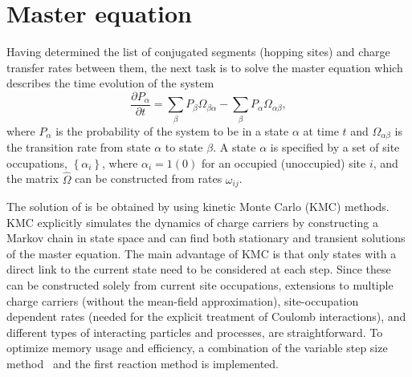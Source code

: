 \section{Master equation}
\label{sec:kmc}

Having determined the list of conjugated segments (hopping sites) and charge transfer rates between them, the next task is to solve the master equation which describes the time evolution of the system
%
\begin{equation}
\label{equ:master}
\frac{\partial P_\alpha}{\partial t} = \sum_{\beta} P_\beta \Omega_{\beta \alpha} - 
\sum_{\beta} P_\alpha \Omega_{\alpha \beta},
\end{equation}
%
where $P_\alpha$ is the probability of the system to be in a state $\alpha$ at time $t$ and $\Omega_{\alpha \beta}$ is the transition rate from state $\alpha$ to state $\beta$. A state $\alpha$ is specified by a set of site occupations, $\left\{ \alpha_i \right\}$, where $\alpha_i = 1 (0)$ for an occupied (unoccupied) site $i$, and the matrix $\hat{\Omega}$ can be constructed from rates $\omega_{ij}$.

The solution of  is be obtained by using kinetic Monte Carlo (KMC) methods. KMC explicitly simulates the dynamics of charge carriers by constructing a Markov chain in state space and can find both stationary and transient solutions of the master equation. The main advantage of KMC is that only states with a direct link to the current state need to be considered at each step. Since these can be constructed solely from current site occupations, extensions to multiple charge carriers (without the mean-field approximation), site-occupation dependent rates (needed for the explicit treatment of Coulomb interactions), and different types of interacting particles and processes, are straightforward. To optimize memory usage and efficiency, a combination of the variable step size method~\cite{bortz_new_1975} and the first reaction method is implemented.